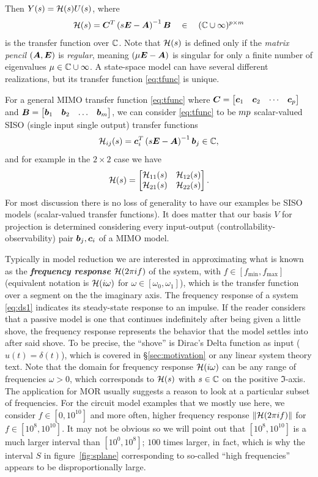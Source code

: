         Then $Y(s)=\mathcal{H}(s) U(s)$, where 
        \begin{equation}
                \mathcal{H}(s) = \bm{C}^T\left(s\bm{E}-\bm{A}\right)^{-1}\bm{B} \quad \in \quad(\mathbb{C}\cup\infty)^{p\times m}
                \label{eq:tfunc}
        \end{equation}
        is the transfer function over $\mathbb{C}$.
Note that $\mathcal{H}(s)$
        is defined only if the \emph{matrix pencil} $(\bm{A},\bm{E})$ is \emph{regular}, meaning 
        $(\mu \bm{E}-\bm{A})$ is singular for only a finite number of eigenvalues $\mu\in\mathbb{C}\cup \infty$. A state-space model can have several different realizations, but its transfer function \eqref{eq:tfunc} is unique.  

For a general MIMO transfer function \eqref{eq:tfunc} where $\bm{C}=\begin{bmatrix} \bm{c}_1 & \bm{c}_2 & \cdots  &\bm{c}_p\end{bmatrix}$ and 
$\bm{B}=\begin{bmatrix} \bm{b}_1& \bm{b}_2&\ldots&\bm{b}_m\end{bmatrix}$, we can consider \eqref{eq:tfunc} to be $m p$ scalar-valued SISO (single input single output) transfer functions 
\[
\mathcal{H}_{ij}(s) = \bm{c}_i^T \left(s\bm{E}-\bm{A}\right)^{-1} \bm{b}_j \in \mathbb{C}, 
\]
and for example in the $2\times 2$ case we have 
\[
\mathcal{H}(s) = \begin{bmatrix} \mathcal{H}_{11}(s) & \mathcal{H}_{12}(s) \\ \mathcal{H}_{21}(s) & \mathcal{H}_{22}(s)\end{bmatrix}.
\]
For most discussion there is no loss of generality to have our examples be SISO models (scalar-valued transfer functions).  It does matter that our basis $V$ for projection is determined considering every input-output (controllability-observability) pair $\bm{b}_j,\bm{c}_i$ of a MIMO model.


\bigskip   
Typically in model reduction we are interested in approximating what is known as the \textbf{\emph{frequency response}}  $\mathcal{H}(2\pi i f)$ of the system, with
$f\in\left[f_\mathrm{min},f_\mathrm{max}\right]$ (equivalent notation is $\mathcal{H}(i \omega)$ for $\omega\in [\omega_0, \omega_1]$), which is the transfer function over a segment on the the imaginary axis.  The frequency response of a system \eqref{eq:ds1} indicates its steady-state response to an impulse.    If the reader considers that a passive model is one that continues indefinitely after being given a little shove,  the frequency response represents the behavior that the model settles into after said shove.  To be precise, the ``shove'' is Dirac's Delta function as input ($u(t)=\delta(t)$), which is covered in \S\ref{sec:motivation} or any linear system theory text.  Note that the domain for frequency response $\mathcal{H}(i \omega)$ can be any range of frequencies $\omega>0$, which corresponds to $\mathcal{H}(s)$ with $s\in\mathbb{C}$ on the positive $\Im$-axis.  The application for MOR usually suggests a reason to look at a particular subset of frequencies.  For the circuit model examples that we mostly use here, we consider $f\in[0, 10^{10}]$ and more often, higher frequency response $\|\mathcal{H}(2\pi i f)\|$ for $f\in[10^8, 10^{10}]$.  It may not be obvious so we will point out that $[10^8, 10^{10}]$ is a much larger interval than $[10^0, 10^{8}]$; $100$ times larger, in fact, which is why the interval $S$ in figure~\ref{fig:splane} corresponding to so-called ``high frequencies'' appears to be disproportionally large.

